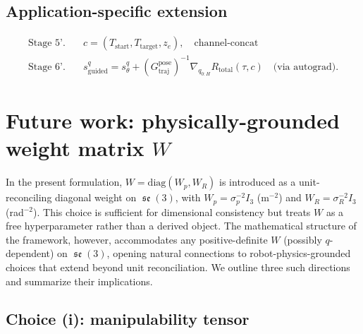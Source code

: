 \documentclass[11pt,a4paper]{article}
\DeclareMathOperator{\se}{\mathfrak{se}}
\begin{document}
\subsection{Application-specific extension}

\begin{align}
\text{Stage 5'.}\quad & c = (T_{\text{start}}, T_{\text{target}}, z_e), \quad \text{channel-concat} \\
\text{Stage 6'.}\quad & s_{\text{guided}}^q = s_\theta^q + (G_{\text{traj}}^{\text{pose}})^{-1} \nabla_{q_{0:H}} R_{\text{total}}(\tau, c) \quad \text{(via autograd)}.
\end{align}

\section{Future work: physically-grounded weight matrix \texorpdfstring{$W$}{W}}
\label{sec:future-W}

In the present formulation, $W = \mathrm{diag}(W_p, W_R)$ is introduced as a unit-reconciling diagonal weight on $\se(3)$, with $W_p = \sigma_p^{-2} I_3$ (m$^{-2}$) and $W_R = \sigma_R^{-2} I_3$ (rad$^{-2}$). This choice is sufficient for dimensional consistency but treats $W$ as a free hyperparameter rather than a derived object. The mathematical structure of the framework, however, accommodates any positive-definite $W$ (possibly $q$-dependent) on $\se(3)$, opening natural connections to robot-physics-grounded choices that extend beyond unit reconciliation. We outline three such directions and summarize their implications.

\subsection{Choice (i): manipulability tensor}
\end{document}

